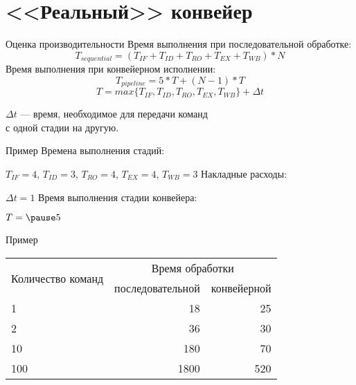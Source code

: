 \section{<<Реальный>> конвейер}

\begin{frame}{Оценка производительности}
Время выполнения при последовательной обработке:
\begin{displaymath}
T_{sequential} = (T_{IF} + T_{ID} + T_{RO} + T_{EX} + T_{WB}) * N
\end{displaymath}
\vfill\pause
Время выполнения при конвейерном исполнении:
\begin{displaymath}
T_{pipeline} = 5 * T + (N - 1) * T
\end{displaymath}
\begin{displaymath}
T = max \{T_{IF}, T_{ID}, T_{RO}, T_{EX}, T_{WB}\} + \Delta t
\end{displaymath}
\begin{center}
$\Delta t$ --- время, необходимое для передачи команд\\с одной стадии на другую.
\end{center}
\end{frame}

\begin{frame}{Пример}
Времена выполнения стадий:

$T_{IF} = 4$, $T_{ID} = 3$, $T_{RO} = 4$, $T_{EX} = 4$, $T_{WB} = 3$
\vfill
Накладные расходы:

$\Delta t = 1$
\vfill
Время выполнения стадии конвейера:

$T = \pause5$
\end{frame}

\begin{frame}{Пример}
\begin{table}[htpb]
    \centering
    \begin{tabular}{|l|r|r|}
    \hline
    \multirow{2}{*}{Количество команд}   &   \multicolumn{2}{c|}{Время обработки} \\
    \cline{2-3}
                        &   последовательной    &   конвейерной \\
    \hline
    1                   &   18                  &   25          \\
    \hline
    2                   &   36                  &   30          \\
    \hline
    10                  &   180                 &   70          \\
    \hline
    100                 &   1800                &   520         \\
    \hline
    \end{tabular}
\end{table}
\end{frame}


